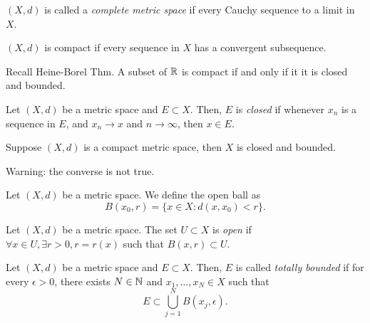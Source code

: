 \documentclass[twoside]{article}
\begin{document}
\begin{definition}
    $(X, d)$ is called a \textit{complete metric space} if every Cauchy sequence to a
    limit in $X$.
\end{definition}

\begin{definition}
    $(X, d)$ is compact if every sequence in $X$ has a convergent subsequence.

    Recall Heine-Borel Thm. A subset of $\mathbb{R}$ is compact if and only if it it 
    is closed and bounded.
\end{definition}

\begin{definition}
    Let $(X, d)$ be a metric space and $E \subset X$. Then, $E$ is \textit{closed}
    if whenever $x_{n}$ is a sequence in $E$, and $x_{n} \to x$ 
    and $n \to \infty$, then $x \in E$.
\end{definition}

\begin{theorem}
    Suppose $(X, d)$ is a compact metric space, then $X$ is closed and bounded.
    
    Warning: the converse is not true.
\end{theorem}

\begin{definition}
    Let $(X, d)$ be a metric space. We define the open ball as 
    \begin{equation*}
        B(x_{0}, r) = \{x \in X : d(x, x_{0}) < r\}.
    \end{equation*}
\end{definition}

\begin{definition}
    Let $(X, d)$ be a metric space. The set $U \subset X$ is \textit{open} if 
    $\forall x \in U, \exists r > 0, r = r(x)$ such that 
    $B(x, r) \subset U$.
\end{definition}

\begin{definition}
    Let $(X, d)$ be a metric space and $E \subset X$. Then, $E$ is 
    called \textit{totally bounded} if for every $\epsilon > 0$,
    there exists $N \in \mathbb{N}$ and $x_{1}, \dots, x_{N} \in X$
    such that
    \begin{equation*}
        E \subset \bigcup_{j = 1}^{N} B(x_{j}, \epsilon).
    \end{equation*}
\end{definition}
\end{document}
